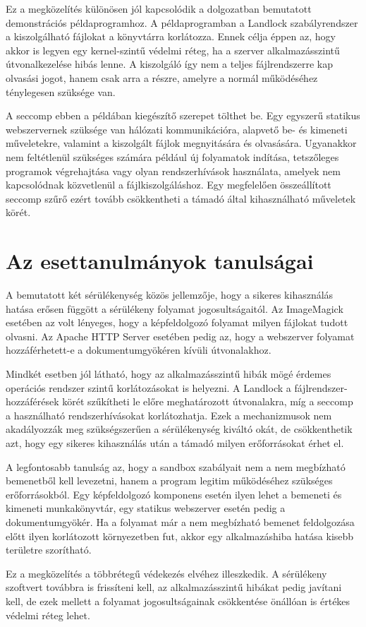 Ez a megközelítés különösen jól kapcsolódik a dolgozatban bemutatott
 demonstrációs példaprogramhoz. A példaprogramban
a Landlock szabályrendszer a kiszolgálható fájlokat a  könyvtárra
korlátozza. Ennek célja éppen az, hogy akkor is legyen egy kernel-szintű
védelmi réteg, ha a szerver alkalmazásszintű útvonalkezelése hibás lenne. A
kiszolgáló így nem a teljes fájlrendszerre kap olvasási jogot, hanem csak arra
a részre, amelyre a normál működéséhez ténylegesen szüksége van.

A seccomp ebben a példában kiegészítő szerepet tölthet be. Egy egyszerű
statikus webszervernek szüksége van hálózati kommunikációra, alapvető be- és
kimeneti műveletekre, valamint a kiszolgált fájlok megnyitására és olvasására.
Ugyanakkor nem feltétlenül szükséges számára például új folyamatok indítása,
tetszőleges programok végrehajtása vagy olyan rendszerhívások használata,
amelyek nem kapcsolódnak közvetlenül a fájlkiszolgáláshoz. Egy megfelelően
összeállított seccomp szűrő ezért tovább csökkentheti a támadó által
kihasználható műveletek körét.

\section{Az esettanulmányok tanulságai}

A bemutatott két sérülékenység közös jellemzője, hogy a sikeres kihasználás
hatása erősen függött a sérülékeny folyamat jogosultságaitól. Az ImageMagick
esetében az volt lényeges, hogy a képfeldolgozó folyamat milyen fájlokat tudott
olvasni. Az Apache HTTP Server esetében pedig az, hogy a webszerver folyamat
hozzáférhetett-e a dokumentumgyökéren kívüli útvonalakhoz.

Mindkét esetben jól látható, hogy az alkalmazásszintű hibák mögé érdemes
operációs rendszer szintű korlátozásokat is helyezni. A Landlock a
fájlrendszer-hozzáférések körét szűkítheti le előre meghatározott útvonalakra,
míg a seccomp a használható rendszerhívásokat korlátozhatja. Ezek a
mechanizmusok nem akadályozzák meg szükségszerűen a sérülékenység kiváltó okát,
de csökkenthetik azt, hogy egy sikeres kihasználás után a támadó milyen
erőforrásokat érhet el.

A legfontosabb tanulság az, hogy a sandbox szabályait nem a nem megbízható
bemenetből kell levezetni, hanem a program legitim működéséhez szükséges
erőforrásokból. Egy képfeldolgozó komponens esetén ilyen lehet a bemeneti és
kimeneti munkakönyvtár, egy statikus webszerver esetén pedig a
dokumentumgyökér. Ha a folyamat már a nem megbízható bemenet feldolgozása előtt
ilyen korlátozott környezetben fut, akkor egy alkalmazáshiba hatása kisebb
területre szorítható.

Ez a megközelítés a többrétegű védekezés elvéhez illeszkedik. A sérülékeny
szoftvert továbbra is frissíteni kell, az alkalmazásszintű hibákat pedig
javítani kell, de ezek mellett a folyamat jogosultságainak csökkentése
önállóan is értékes védelmi réteg lehet.
